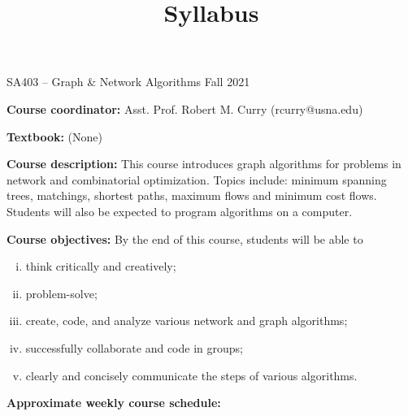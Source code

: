 \documentclass[12pt]{article}
\makeatletter
\theoremstyle{definition}
\newcommand{\graphbox}[5]%
{
\begin{tikzpicture}
     [>=latex,scale=#5]
     
     \draw [->,very thick] (#1, 0) -- (#2, 0) node[right] {$x$};
     \draw [->,very thick] (0, #3) -- (0, #4) node[above] {$y$};
     
     \draw[step=1cm,thick,dotted] (#1,#3) grid (#2,#4);
   \end{tikzpicture}
   }
\renewcommand{\maketitle}{
  \noindent SA403 -- Graph \& Network Algorithms \hfill Fall 2021

  \begin{center}\large{\textbf{\@title}}\end{center}
}
\makeatother
\begin{document}

\title{Syllabus}


\maketitle

\noindent \textbf{Course coordinator:}  Asst. Prof. Robert M. Curry  (rcurry@usna.edu)

\noindent \textbf{Textbook:} (None)

\noindent \textbf{Course description: } This course introduces graph algorithms for problems in network and combinatorial optimization. Topics include: minimum spanning trees, matchings, shortest paths, maximum flows and minimum cost flows. Students will also be expected to program algorithms on a computer.

\noindent \textbf{Course objectives:}  By the end of this course, students will be able to
\vspace{-2mm}
\begin{enumerate}[(i)]
	\item think critically and creatively;
	\item problem-solve;
	\item create, code, and analyze various network and graph algorithms;
	\item successfully collaborate and code in groups;
	\item clearly and concisely communicate the steps of various algorithms.
\end{enumerate}

\noindent \textbf{Approximate weekly course schedule:} 
\end{document}

